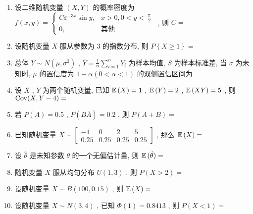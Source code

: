 \begin{enumerate}
	\item 设二维随机变量 $(X,Y)$ 的概率密度为 $f(x,y)=
	\begin{cases}
	 C\ee^{-3x}\sin y, & x>0, 0<y<\frac{\uppi}{2}\\
	0, & \text{其他}
	\end{cases}
	$ , 则 $C=$
	
	\underline{\hspace{8pc}}

	\item 设随机变量 $X$ 服从参数为 $3$ 的指数分布, 则 $P\left\{X\geqslant  1\right\}=$\underline{\hspace{8pc}}

	\item 总体 $Y\sim N\left(\mu,\sigma^2\right)$ , $\overline{Y}=\frac{1}{n}\sum_{i=1}^{n}Y_i$ 为样本均值, $S$ 为样本标准差, 当 $\sigma$ 为未知时, $\mu$ 的置信度为 $1-\alpha (0<\alpha<1)$ 的双侧置信区间为\underline{\hspace{8pc}}

	\item 设 $X$ , $Y$ 为两个随机变量, 已知 $\mathbb{E}\,(X)=1$ , $\mathbb{E}\,(Y)=2$ , $\mathbb{E}\,(XY)=5$ , 则 $\mathrm{Cov}(X,Y-4)=$
	
	\underline{\hspace{8pc}}
	
	\item 若 $P(A)=0.5$ , $P\left(B\overline{A}\right)=0.2$ , 则 $P(A+B)=$\underline{\hspace{8pc}}
	
	\item 已知随机变量 $X\sim
	\begin{bmatrix}
	-1 & 0 & 2 & 5\\
	0.25 & 0.25 & 0.25 & 0.25
	\end{bmatrix}
	$ , 那么 $\mathbb{E}\,(X)=$\underline{\hspace{8pc}}
	
	\item 设 $\hat\theta$ 是未知参数 $\theta$ 的一个无偏估计量, 则 $\mathbb{E}\,(\hat\theta)=$\underline{\hspace{8pc}}

	\item 随机变量 $X$ 服从均匀分布 $U(1,3)$ , 则 $P(X>2)=$\underline{\hspace{8pc}}
	
	\item 设随机变量 $X\sim B(100,0.15)$ , 则 $\mathbb{E}\,(X)=$\underline{\hspace{8pc}}
	
	\item 设随机变量 $X\sim N(3,4)$ , 已知 $\varPhi(1)=0.8413$ , 则 $P(X<1)=$\underline{\hspace{8pc}}
	

\end{enumerate}
